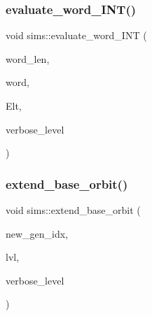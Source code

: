 \mbox{\label{classsims_aac8aa3cabbbd4180db8c647156d0f7d4}} 
\subsubsection{\texorpdfstring{evaluate\+\_\+word\+\_\+\+I\+N\+T()}{evaluate\_word\_INT()}}
{\footnotesize\ttfamily void sims\+::evaluate\+\_\+word\+\_\+\+I\+NT (\begin{DoxyParamCaption}\item[{\mbox{\hyperlink{galois_8h_a09fddde158a3a20bd2dcadb609de11dc}{I\+NT}}}]{word\+\_\+len,  }\item[{\mbox{\hyperlink{galois_8h_a09fddde158a3a20bd2dcadb609de11dc}{I\+NT}} $\ast$}]{word,  }\item[{\mbox{\hyperlink{galois_8h_a09fddde158a3a20bd2dcadb609de11dc}{I\+NT}} $\ast$}]{Elt,  }\item[{\mbox{\hyperlink{galois_8h_a09fddde158a3a20bd2dcadb609de11dc}{I\+NT}}}]{verbose\+\_\+level }\end{DoxyParamCaption})}

\mbox{\label{classsims_a1ded039dbe83239f4e116fe5b84fdcea}} 
\subsubsection{\texorpdfstring{extend\+\_\+base\+\_\+orbit()}{extend\_base\_orbit()}}
{\footnotesize\ttfamily void sims\+::extend\+\_\+base\+\_\+orbit (\begin{DoxyParamCaption}\item[{\mbox{\hyperlink{galois_8h_a09fddde158a3a20bd2dcadb609de11dc}{I\+NT}}}]{new\+\_\+gen\+\_\+idx,  }\item[{\mbox{\hyperlink{galois_8h_a09fddde158a3a20bd2dcadb609de11dc}{I\+NT}}}]{lvl,  }\item[{\mbox{\hyperlink{galois_8h_a09fddde158a3a20bd2dcadb609de11dc}{I\+NT}}}]{verbose\+\_\+level }\end{DoxyParamCaption})}

\mbox{\label{classsims_a20958fd83e43b33c009e873b9df2fa11}} 
